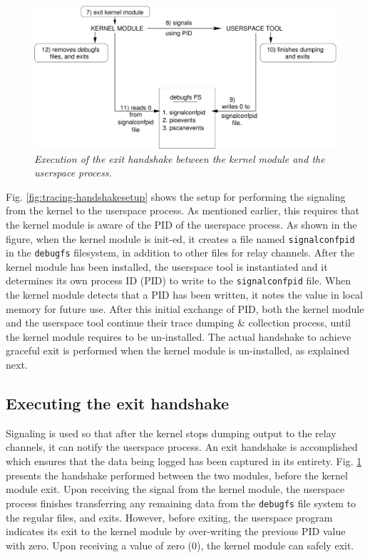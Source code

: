 \begin{figure}
    \centering
    \includegraphics[scale=0.65]{tracingchap-figures/tracing-exithandshake.pdf}
    \caption{\textit{Execution of the exit handshake between the kernel
		module and the userspace process.}}
    \label{fig:tracing-exithandshake}
\end{figure}

Fig. \ref{fig:tracing-handshakesetup} shows the setup for performing the
signaling from the kernel to the userspace process. As mentioned earlier,
this requires that the kernel module is aware of the PID of the userspace
process. As shown in the figure, when the kernel module is init-ed, 
it creates a file named \texttt{signalconfpid} in the \texttt{debugfs} 
filesystem, in addition to other files for relay channels. After the
kernel module has been installed, the userspace tool is instantiated
and it determines its own process ID (PID) to write to the 
\texttt{signalconfpid} file. When the kernel module detects that a PID
has been written, it notes the value in local memory for future use.
After this initial exchange of PID, both the kernel module and the
userspace tool continue their trace dumping \& collection process, until
the kernel module requires to be un-installed. The actual handshake
to achieve graceful exit is performed when the kernel module is 
un-installed, as explained next.

\subsection{Executing the exit handshake}
Signaling is used so that after the kernel stops dumping output to the 
relay channels, it can notify the userspace process. An exit handshake is
accomplished which ensures that the data being logged has been captured
in its entirety. Fig. \ref{fig:tracing-exithandshake} presents the
handshake performed between the two modules, before the kernel module exit.
Upon receiving the signal from the kernel module, 
the userspace process finishes transferring any remaining data from 
the \texttt{debugfs} file system to the regular files, and exits. However, 
before exiting, the userspace program indicates its exit to the kernel
module by over-writing the previous PID value with zero. Upon receiving
a value of zero (0), the kernel module can safely exit.


